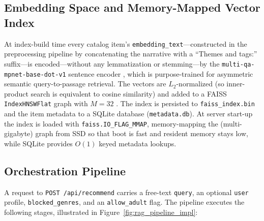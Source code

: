 \subsection{Embedding Space and Memory-Mapped Vector Index}
At index-build time every catalog item's \texttt{embedding\_text}---constructed in the preprocessing pipeline by concatenating the narrative with a ``Themes and tags:'' suffix---is encoded---without any lemmatization or stemming---by the \texttt{multi-\allowbreak qa-\allowbreak mpnet-\allowbreak base-\allowbreak dot-\allowbreak v1} sentence encoder \cite{reimers2019sentencebert}, which is purpose-trained for asymmetric semantic query-to-passage retrieval. The vectors are $L_2$-normalized (so inner-product search is equivalent to cosine similarity) and added to a FAISS \texttt{IndexHNSWFlat} graph with $M = 32$ \cite{johnson2019billion}. The index is persisted to \texttt{faiss\_index.bin} and the item metadata to a SQLite database (\texttt{metadata.db}). At server start-up the index is loaded with \texttt{faiss.IO\_FLAG\_MMAP}, memory-mapping the (multi-gigabyte) graph from SSD so that boot is fast and resident memory stays low, while SQLite provides $O(1)$ keyed metadata lookups.

\subsection{Orchestration Pipeline}
A request to \texttt{POST /api/recommend} carries a free-text \texttt{query}, an optional \texttt{user} profile, \texttt{blocked\_genres}, and an \texttt{allow\_adult} flag. The pipeline executes the following stages, illustrated in Figure~\ref{fig:rag_pipeline_impl}:

